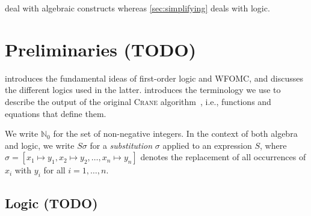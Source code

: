 \documentclass{article}
\theoremstyle{definition}
\begin{document}
 deal with algebraic constructs whereas
\cref{sec:simplifying} deals with logic.

\section{Preliminaries (TODO)}

 introduces the fundamental ideas of first-order logic and
WFOMC, and discusses the different logics used in the latter.\@
{} introduces the terminology we use to describe the output of
the original \textsc{Crane} algorithm~\cite{DBLP:conf/kr/DilkasB23}, i.e.,
functions and equations that define them.

We write $\mathbb{N}_{0}$ for the set of non-negative integers. In the context
of both algebra and logic, we write $S\sigma$ for a \emph{substitution} $\sigma$
applied to an expression $S$, where
$\sigma = [x_{1} \mapsto y_{1}, x_{2} \mapsto y_{2}, \dots, x_{n} \mapsto y_{n}]$
denotes the replacement of all occurrences of $x_{i}$ with $y_{i}$ for all
$i = 1, \dots, n$.

\subsection{Logic (TODO)}\label{sec:logic}

\end{document}
